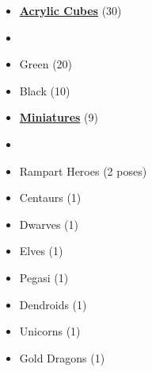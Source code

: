 \begin{multicols*}{3}
\begin{itemize}[leftmargin=0pt, label={}, noitemsep]
  \item \textbf{\normalsize{\underline{Acrylic Cubes}}} (30)
  \item
  \item Green (20)
  \item Black (10)
\end{itemize}

\begin{itemize}[leftmargin=0pt, label={}, noitemsep]
  \item \textbf{\normalsize{\underline{Miniatures}}} (9)
  \item
  \item Rampart Heroes (2 poses)
  \item Centaurs (1)
  \item Dwarves (1)
  \item Elves (1)
  \item Pegasi (1)
  \item Dendroids (1)
  \item Unicorns (1)
  \item Gold Dragons (1)
\end{itemize}

\columnbreak


\end{multicols*}
